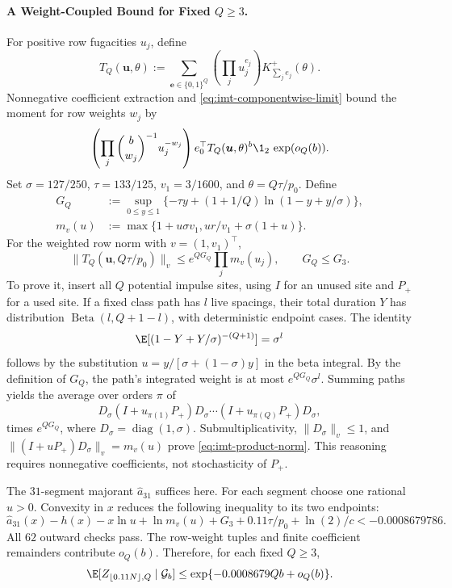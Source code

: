 \paragraph{A Weight-Coupled Bound for Fixed $Q\ge3$.}
For positive row fugacities $u_j$, define
\[
 T_Q(\boldsymbol u,\theta):=\sum_{\boldsymbol e\in\{0,1\}^Q}
 \left(\prod_j u_j^{e_j}\right)K_{\sum_j e_j}^+(\theta).
\]
Nonnegative coefficient extraction and \eqref{eq:imt-componentwise-limit}
bound the moment for row weights $w_j$ by
\[
 \left(\prod_j\binom b{w_j}^{-1}u_j^{-w_j}\right)
 e_0^\top T_Q(\boldsymbol u,\theta)^b\1_2\,\exp(o_Q(b)).
\]
Set $\sigma=127/250$, $\tau=133/125$, $v_1=3/1600$, and
$\theta=Q\tau/p_0$. Define
\begin{align*}
 G_Q&:=\sup_{0\le y\le1}\{-\tau y+(1+1/Q)\ln(1-y+y/\sigma)\},\\
 m_v(u)&:=\max\{1+u\sigma v_1,ur/v_1+\sigma(1+u)\}.
\end{align*}
For the weighted row norm with $v=(1,v_1)^\top$,
\begin{equation}
 \|T_Q(\boldsymbol u,Q\tau/p_0)\|_v
 \le e^{QG_Q}\prod_jm_v(u_j),\qquad G_Q\le G_3.
 \label{eq:imt-product-norm}
\end{equation}
To prove it, insert all $Q$ potential impulse sites, using $I$ for
an unused site and $P_+$ for a used site. If a fixed class path has $l$ live
spacings, their total duration $Y$ has distribution
$\operatorname{Beta}(l,Q+1-l)$, with deterministic endpoint cases. The identity
\[
 \E[(1-Y+Y/\sigma)^{-(Q+1)}]=\sigma^l
\]
follows by the substitution $u=y/[\sigma+(1-\sigma)y]$ in the beta integral.
By the definition of $G_Q$, the path's integrated weight is at most
$e^{QG_Q}\sigma^l$. Summing paths yields the average over orders $\pi$ of
\[
 D_\sigma(I+u_{\pi(1)}P_+)D_\sigma\cdots
 (I+u_{\pi(Q)}P_+)D_\sigma,
\]
times $e^{QG_Q}$, where $D_\sigma=\operatorname{diag}(1,\sigma)$.
Submultiplicativity, $\|D_\sigma\|_v\le1$, and
$\|(I+uP_+)D_\sigma\|_v=m_v(u)$ prove \eqref{eq:imt-product-norm}.
This reasoning requires nonnegative coefficients, not stochasticity of $P_+$.

The $31$-segment majorant $\widehat a_{31}$ suffices here. For each segment
choose one rational $u>0$. Convexity in $x$ reduces the following inequality
to its two endpoints:
\[
 \widehat a_{31}(x)-h(x)-x\ln u+\ln m_v(u)
 +G_3+0.11\tau/p_0+\ln(2)/c<-0.0008679786.
\]
All $62$ outward checks pass. The row-weight tuples and finite coefficient
remainders contribute $o_Q(b)$. Therefore, for each fixed $Q\ge3$,
\[
 \E[Z_{\lfloor0.11N\rfloor,Q}\mid\mathcal G_b]
 \le\exp\{-0.0008679Qb+o_Q(b)\}.
\]


